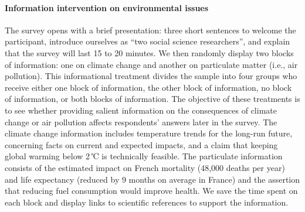 \documentclass[12pt]{article} %
\begin{document}


\paragraph{Information intervention on environmental issues}


The survey opens with a brief presentation: three short sentences to welcome the participant, introduce ourselves as ``two social science researchers'', and explain that the survey will last 15 to 20 minutes. We then randomly display two blocks of information: one on climate change and another on particulate matter (i.e., air pollution). This informational treatment divides the sample into four groups who receive either one block of information, the other block of information, no block of information, or both blocks of information. The objective of these treatments is to see whether providing salient information on the consequences of climate change or air pollution affects respondents' answers later in the survey. The climate change information includes temperature trends for the long-run future, concerning facts on current and expected impacts, and a claim that keeping global warming below 2\,℃ is technically feasible. The particulate information consists of the estimated impact on French mortality (48,000 deaths per year) and life expectancy (reduced by 9 months on average in France) and the assertion that reducing fuel consumption would improve health. We save the time spent on each block and display links to scientific references to support the information.
\end{document}
